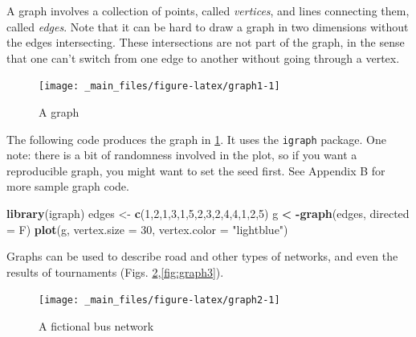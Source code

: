 \documentclass[
]{book}
\newenvironment{Shaded}{\begin{snugshade}}{\end{snugshade}}
\newcommand{\AttributeTok}[1]{\textcolor[rgb]{0.13,0.29,0.53}{#1}}
\newcommand{\DecValTok}[1]{\textcolor[rgb]{0.00,0.00,0.81}{#1}}
\newcommand{\FunctionTok}[1]{\textcolor[rgb]{0.13,0.29,0.53}{\textbf{#1}}}
\newcommand{\NormalTok}[1]{#1}
\newcommand{\OtherTok}[1]{\textcolor[rgb]{0.56,0.35,0.01}{#1}}
\newcommand{\SpecialCharTok}[1]{\textcolor[rgb]{0.81,0.36,0.00}{\textbf{#1}}}
\newcommand{\StringTok}[1]{\textcolor[rgb]{0.31,0.60,0.02}{#1}}
\theoremstyle{definition}
\theoremstyle{definition}
\theoremstyle{definition}
\theoremstyle{definition}
\theoremstyle{remark}
\begin{document}
A graph involves a collection of points, called \emph{vertices}, and lines connecting them, called \emph{edges}. Note that it can be hard to draw a graph in two dimensions without the edges intersecting. These intersections are not part of the graph, in the sense that one can't switch from one edge to another without going through a vertex.

\begin{figure}

{\centering \texttt{[image: \_main\_files/figure-latex/graph1-1]} 

}

\caption{A graph}\label{fig:graph1}
\end{figure}

The following code produces the graph in \ref{fig:graph1}. It uses the \texttt{igraph} package. One note: there is a bit of randomness involved in the plot, so if you want a reproducible graph, you might want to set the seed first. See Appendix B for more sample graph code.

\begin{Shaded}
\begin{Highlighting}[]
\FunctionTok{library}\NormalTok{(igraph)}
\NormalTok{edges }\OtherTok{\textless{}{-}} \FunctionTok{c}\NormalTok{(}\DecValTok{1}\NormalTok{,}\DecValTok{2}\NormalTok{,}\DecValTok{1}\NormalTok{,}\DecValTok{3}\NormalTok{,}\DecValTok{1}\NormalTok{,}\DecValTok{5}\NormalTok{,}\DecValTok{2}\NormalTok{,}\DecValTok{3}\NormalTok{,}\DecValTok{2}\NormalTok{,}\DecValTok{4}\NormalTok{,}\DecValTok{4}\NormalTok{,}\DecValTok{1}\NormalTok{,}\DecValTok{2}\NormalTok{,}\DecValTok{5}\NormalTok{) }
\NormalTok{g }\SpecialCharTok{\textless{}} \SpecialCharTok{{-}}\FunctionTok{graph}\NormalTok{(edges, }\AttributeTok{directed =}\NormalTok{ F)}
\FunctionTok{plot}\NormalTok{(g, }\AttributeTok{vertex.size =} \DecValTok{30}\NormalTok{, }\AttributeTok{vertex.color =} \StringTok{"lightblue"}\NormalTok{)}
\end{Highlighting}
\end{Shaded}

Graphs can be used to describe road and other types of networks, and even the results of tournaments (Figs. \ref{fig:graph2},\ref{fig:graph3}).

\begin{figure}

{\centering \texttt{[image: \_main\_files/figure-latex/graph2-1]} 

}

\caption{A fictional bus network}\label{fig:graph2}
\end{figure}
\end{document}
